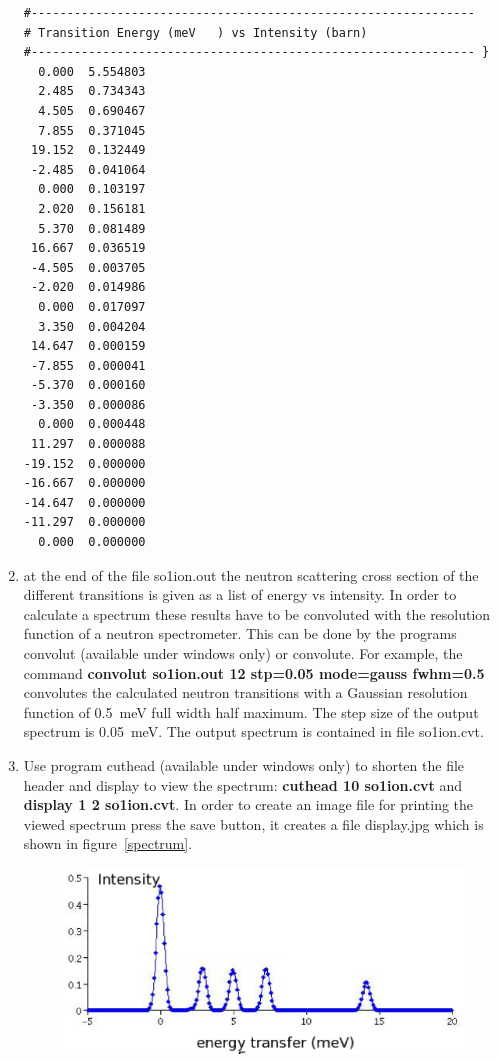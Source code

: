 \begin{enumerate}
{\begin{verbatim}
#-------------------------------------------------------------- 
# Transition Energy (meV   ) vs Intensity (barn)                  
#-------------------------------------------------------------- }
  0.000  5.554803
  2.485  0.734343
  4.505  0.690467
  7.855  0.371045
 19.152  0.132449
 -2.485  0.041064
  0.000  0.103197
  2.020  0.156181
  5.370  0.081489
 16.667  0.036519
 -4.505  0.003705
 -2.020  0.014986
  0.000  0.017097
  3.350  0.004204
 14.647  0.000159
 -7.855  0.000041
 -5.370  0.000160
 -3.350  0.000086
  0.000  0.000448
 11.297  0.000088
-19.152  0.000000
-16.667  0.000000
-14.647  0.000000
-11.297  0.000000
  0.000  0.000000
\end{verbatim}
}
\item at the end of the file {\prg so1ion.out} the neutron scattering cross section of the different 
transitions is given as a list of energy vs intensity. 
In order to calculate a spectrum these results
have to be convoluted with the resolution function of a neutron spectrometer. This can be 
done by the programs {\prg convolut} (available under windows only)
 or {\prg convolute}. For example, the command {\bf
convolut so1ion.out 12 stp=0.05 mode=gauss fwhm=0.5} convolutes the calculated neutron %
transitions
with a Gaussian resolution function of 0.5~meV full width half maximum. The step size of the
output spectrum is 0.05~meV. The output spectrum is contained in file {\prg so1ion.cvt}.
\item 
Use program {\prg cuthead} (available under windows only)
 to shorten the file header and {\prg display}
 to view the spectrum: {\bf cuthead 10 so1ion.cvt} and
{\bf display 1 2  so1ion.cvt}. In order to create an image file for printing the viewed %
spectrum
press the save button, it creates a file {\prg display.jpg} which is shown in figure~\ref{spectrum}.
\begin{figure}[ht]
\begin{center}
\includegraphics[angle=0,width=1.0\textwidth]{figsrc/10KCEFspectrum.eps}

\end{center}
\end{figure}
\end{enumerate}
